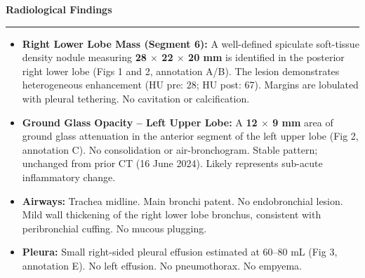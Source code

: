 \documentclass[11pt,a4paper]{article}
\newcommand{\sectionrule}{%
  \vspace{2pt}%
  {\color{RadTeal}\rule{\linewidth}{1.5pt}}%
  \vspace{4pt}%
}
\newcommand{\findingbullet}[1]{%
  \item \small #1%
}
\begin{document}
\vspace{10pt}


\noindent\textbf{\color{RadBlue}\fontsize{11}{13}\selectfont\faMicroscope\hspace{4pt}Radiological Findings}
\vspace{4pt}

\sectionrule{}

\vspace{4pt}

\begin{tcolorbox}[radbox, title={\faLungs\hspace{4pt}Thorax -- Parenchyma \& Airways}]
\vspace{4pt}
\begin{itemize}[leftmargin=14pt, itemsep=3pt, parsep=0pt]
  \findingbullet{\textbf{Right Lower Lobe Mass (Segment 6):} A well-defined spiculate soft-tissue density nodule measuring \textbf{28 $\times$ 22 $\times$ 20 mm} is identified in the posterior right lower lobe (Figs 1 and 2, annotation A/B). The lesion demonstrates heterogeneous enhancement (HU pre: 28; HU post: 67). Margins are lobulated with pleural tethering. No cavitation or calcification.}
  \findingbullet{\textbf{Ground Glass Opacity -- Left Upper Lobe:} A \textbf{12 $\times$ 9 mm} area of ground glass attenuation in the anterior segment of the left upper lobe (Fig 2, annotation C). No consolidation or air-bronchogram. Stable pattern; unchanged from prior CT (16 June 2024). Likely represents sub-acute inflammatory change.}
  \findingbullet{\textbf{Airways:} Trachea midline. Main bronchi patent. No endobronchial lesion. Mild wall thickening of the right lower lobe bronchus, consistent with peribronchial cuffing. No mucous plugging.}
  \findingbullet{\textbf{Pleura:} Small right-sided pleural effusion estimated at 60--80 mL (Fig 3, annotation E). No left effusion. No pneumothorax. No empyema.}
\end{itemize}
\vspace{4pt}
\end{tcolorbox}

\vspace{6pt}
\end{document}
